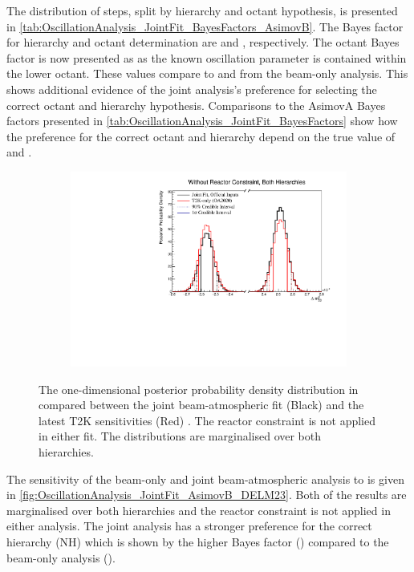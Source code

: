 The distribution of steps, split by hierarchy and octant hypothesis, is presented in \autoref{tab:OscillationAnalysis_JointFit_BayesFactors_AsimovB}. The Bayes factor for hierarchy and octant determination are  and , respectively. The octant Bayes factor is now presented as  as the known oscillation parameter is contained within the lower octant. These values compare to  and  from the beam-only analysis. This shows additional evidence of the joint analysis's preference for selecting the correct octant and hierarchy hypothesis. Comparisons to the AsimovA Bayes factors presented in \autoref{tab:OscillationAnalysis_JointFit_BayesFactors} show how the preference for the correct octant and hierarchy depend on the true value of  and .

\begin{figure}[h]
  \begin{subfigure}[t]{0.98\textwidth}
    \includegraphics[width=\textwidth, trim={0mm 0mm 0mm 0mm}, clip,page=1]{Figures/OA/JointFit_OA2020_Comp_AsimovB/ContourComparison_1D_dm32_BH_2_woRC_UnSmeared_CredibleInterval.pdf}
  \end{subfigure}
  \caption{The one-dimensional posterior probability density distribution in  compared between the joint beam-atmospheric fit (Black) and the latest T2K sensitivities (Red) \cite{t2k_tn_399}. The reactor constraint is not applied in either fit. The distributions are marginalised over both hierarchies.}
  \label{fig:OscillationAnalysis_JointFit_AsimovB_DELM23}
\end{figure}

The sensitivity of the beam-only and joint beam-atmospheric analysis to  is given in \autoref{fig:OscillationAnalysis_JointFit_AsimovB_DELM23}. Both of the results are marginalised over both hierarchies and the reactor constraint is not applied in either analysis. The joint analysis has a stronger preference for the correct hierarchy (NH) which is shown by the higher Bayes factor () compared to the beam-only analysis (). 
